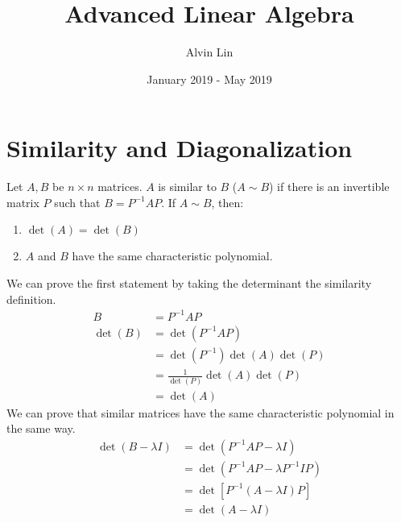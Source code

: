 \documentclass{math}
\title{Advanced Linear Algebra}
\author{Alvin Lin}
\date{January 2019 - May 2019}
\begin{document}
\maketitle

\section*{Similarity and Diagonalization}
Let \( A,B \) be \( n\times n \) matrices. \( A \) is similar to \( B \)
(\( A\sim B\)) if there is an invertible matrix \( P \) such that
\( B = P^{-1}AP \). If \( A\sim B \), then:
\begin{enumerate}
  \item \( \det(A) = \det(B) \)
  \item \( A \) and \( B \) have the same characteristic polynomial.
\end{enumerate}
We can prove the first statement by taking the determinant the similarity
definition.
\begin{align*}
  B &= P^{-1}AP \\
  \det(B) &= \det(P^{-1}AP) \\
  &= \det(P^{-1})\det(A)\det(P) \\
  &= \frac{1}{\det(P)}\det(A)\det(P) \\
  &= \det(A)
\end{align*}
We can prove that similar matrices have the same characteristic polynomial in
the same way.
\begin{align*}
  \det(B-\lambda I) &= \det(P^{-1}AP-\lambda I) \\
  &= \det(P^{-1}AP-\lambda P^{-1}IP) \\
  &= \det\left[P^{-1}(A-\lambda I)P\right] \\
  &= \det(A-\lambda I)
\end{align*}
\end{document}
